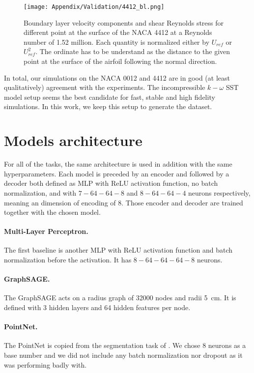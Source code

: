 \begin{subappendices}
	\begin{figure}
		\centering
		\texttt{[image: Appendix/Validation/4412\_bl.png]}
		\caption{Boundary layer velocity components and shear Reynolds stress for different point at the surface of the NACA 4412 at a Reynolds number of 1.52 million. Each quantity is normalized either by $U_{ref}$ or $U_{ref}^2$. The ordinate has to be understand as the distance to the given point at the surface of the airfoil following the normal direction.}
		\label{fig:bl_4412}
	\end{figure}
	
	In total, our simulations on the NACA 0012 and 4412 are in good (at least qualitatively) agreement with the experiments. The incompressible $k-\omega$ SST model setup seems the best candidate for fast, stable and high fidelity simulations. In this work, we keep this setup to generate the dataset.
	
	\section{Models architecture}\label{ap:models}
	For all of the tasks, the same architecture is used in addition with the same hyperparameters. Each model is preceded by an encoder and followed by a decoder both defined as MLP with ReLU activation function, no batch normalization, and with $7-64-64-8$ and $8-64-64-4$ neurons respectively, meaning an dimension of encoding of 8. Those encoder and decoder are trained together with the chosen model.
	
	\paragraph{Multi-Layer Perceptron.} The first baseline is another MLP with ReLU activation function and batch normalization before the activation. It has $8-64-64-64-8$ neurons.
	
	\paragraph{GraphSAGE.} The GraphSAGE acts on a radius graph of 32000 nodes and radii \SI{5}{\centi\meter}. It is defined with 3 hidden layers and 64 hidden features per node.
	
	\paragraph{PointNet.} The PointNet is copied from the segmentation task of \cite{qi2016pointnet}. We chose 8 neurons as a base number and we did not include any batch normalization nor dropout as it was performing badly with.
	

\end{subappendices}
